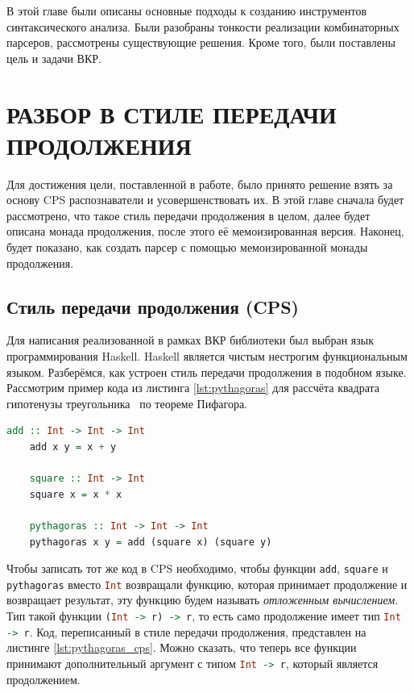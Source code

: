 \documentclass[times]{itmo-student-thesis}
\begin{document}
\chapterconclusion

В этой главе были описаны основные подходы к созданию инструментов синтаксического анализа. Были разобраны тонкости
реализации комбинаторных парсеров, рассмотрены существующие решения. Кроме того, были поставлены цель и задачи ВКР.

\chapter{РАЗБОР В СТИЛЕ ПЕРЕДАЧИ ПРОДОЛЖЕНИЯ}

Для достижения цели, поставленной в работе, было принято решение взять за основу CPS распознаватели и усовершенствовать их.
В этой главе сначала будет рассмотрено, что такое стиль передачи продолжения в целом, далее будет описана монада продолжения,
после этого её мемоизированная версия. Наконец, будет показано, как создать парсер с помощью мемоизированной монады продолжения.

\section{Стиль передачи продолжения (CPS)}\label{sec:cps}

Для написания реализованной в рамках ВКР библиотеки был выбран язык программирования Haskell. Haskell является чистым нестрогим функциональным языком. 
Разберёмся, как устроен стиль передачи продолжения в подобном языке. Рассмотрим пример кода из листинга 
\ref{lst:pythagoras} для рассчёта квадрата гипотенузы треугольника~\cite{noauthor_haskellcontinuation_nodate} по теореме Пифагора.

\begin{lstlisting}[language=Haskell,float=!h,caption={Теорема Пифагора},label={lst:pythagoras}]
    add :: Int -> Int -> Int
    add x y = x + y

    square :: Int -> Int
    square x = x * x

    pythagoras :: Int -> Int -> Int
    pythagoras x y = add (square x) (square y)
\end{lstlisting}

Чтобы записать тот же код в CPS необходимо, чтобы функции \lstinline[language=Haskell]{add},
\lstinline[language=Haskell]{square} и \lstinline[language=Haskell]{pythagoras} вместо \lstinline[language=Haskell]{Int}
возвращали функцию, которая принимает продолжение и возвращает результат, эту функцию будем называть \textit{отложенным вычислением}. Тип такой функции \lstinline[language=Haskell]{(Int -> r) -> r}, 
то есть само продолжение имеет тип \lstinline[language=Haskell]{Int -> r}. Код, переписанный в стиле передачи продолжения, 
представлен на листинге \ref{lst:pythagoras_cps}. Можно сказать, что теперь все функции принимают дополнительный аргумент 
с типом \lstinline[language=Haskell]{Int -> r}, который является продолжением.
\end{document}
